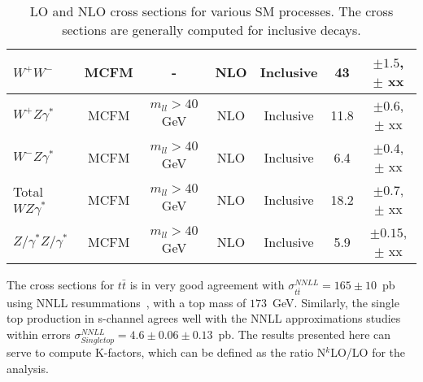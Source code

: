 \begin{table}[hbt]
\begin{center}
\begin{tabular}{|l|c|c|c|c|c|c|}
$W^+W^-$ & MCFM & - & NLO & Inclusive & 43 & $\pm 1.5$, $\pm$ xx \\ \hline
$W^+Z\gamma^*$ & MCFM & $m_{ll} > 40$ GeV & NLO & Inclusive & 11.8 & $\pm 0.6$, $\pm$ xx \\ \hline
$W^-Z\gamma^*$ & MCFM & $m_{ll} > 40$ GeV & NLO & Inclusive & 6.4 & $\pm 0.4$, $\pm$ xx \\ \hline
Total $WZ\gamma^*$ & MCFM & $m_{ll} > 40$ GeV & NLO & Inclusive & 18.2 & $\pm 0.7$, $\pm$ xx \\ \hline
$Z/\gamma^*Z/\gamma^*$ & MCFM & $m_{ll} > 40$ GeV & NLO & Inclusive & 5.9 & $\pm 0.15$, $\pm$ xx \\ \hline
\end{tabular} 
\caption{LO and NLO cross sections for various SM processes. The cross sections are generally
computed for inclusive decays. \label{tab:nlo}}
\end{center}
\end{table}

The cross sections for $t\bar{t}$ is in very good agreement with $\sigma^{NNLL}_{t\bar{t}} = 165 \pm 10$~pb using NNLL 
resummations~\cite{nnllttbar}, with a top mass of $173$~GeV. Similarly, the single top production in s-channel 
agrees well with the NNLL approximations studies~\cite{nnllschannel} within errors $\sigma^{NNLL}_{Single top} = 4.6 \pm 0.06 
\pm 0.13$~pb. The results presented here can serve to compute K-factors, which can be 
defined as the ratio N$^k$LO/LO for the analysis. 
